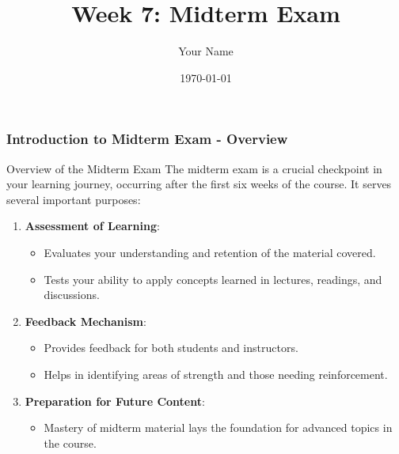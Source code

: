 \documentclass{beamer}
\title{Week 7: Midterm Exam}
\author{Your Name}
\institute{Your Institution}
\date{\today}
\begin{document}
\frame{\titlepage}

\begin{frame}[fragile]
    \frametitle{Introduction to Midterm Exam - Overview}
    \begin{block}{Overview of the Midterm Exam}
        The midterm exam is a crucial checkpoint in your learning journey, occurring after the first six weeks of the course. It serves several important purposes:
    \end{block}
    \begin{enumerate}
        \item \textbf{Assessment of Learning}:
        \begin{itemize}
            \item Evaluates your understanding and retention of the material covered.
            \item Tests your ability to apply concepts learned in lectures, readings, and discussions.
        \end{itemize}
        \item \textbf{Feedback Mechanism}:
        \begin{itemize}
            \item Provides feedback for both students and instructors.
            \item Helps in identifying areas of strength and those needing reinforcement.
        \end{itemize}
        \item \textbf{Preparation for Future Content}:
        \begin{itemize}
            \item Mastery of midterm material lays the foundation for advanced topics in the course.
        \end{itemize}
    \end{enumerate}
\end{frame}
\end{document}

